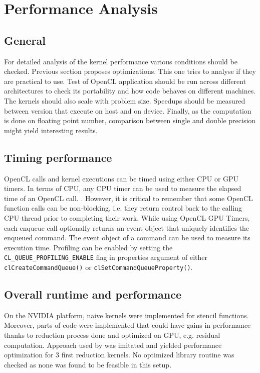 \chapter{Performance Analysis}
\section{General}
For detailed analysis of the kernel performance various conditions should be checked. Previous section proposes optimizations. This one tries to analyse if they are practical to use. Test of OpenCL application should be run across different architectures to check its portability and how code behaves on different machines. The kernels should also scale with problem size. Speedups should be measured between version that execute on host and on device. Finally, as the computation is done on floating point number, comparison between single and double precision might yield interesting results.

\section{Timing performance}
OpenCL calls and kernel executions can be timed using either CPU or GPU timers. In terms of CPU, any CPU timer can be used to measure the elapsed time of an OpenCL call. \cite{nvidia2011openclbest}. However, it is critical to remember that some OpenCL function calls can be non-blocking, i.e. they return control back to the calling CPU thread prior to completing their work. While using OpenCL GPU Timers, each enqueue call optionally returns an event object that uniquely identifies the enqueued command. The event object of a command can be used to measure its execution time. Profiling can be enabled by setting the \texttt{CL\_QUEUE\_PROFILING\_ENABLE} flag in properties argument of either \texttt{clCreateCommandQueue()} or \texttt{clSetCommandQueueProperty()}.\cite{nvidia2011openclbest}

\section{Overall runtime and performance}
On the NVIDIA platform, naive kernels were implemented for stencil functions. Moreover, parts of code were implemented that could have gains in performance thanks to reduction process done and optimized on GPU, e.g. residual computation. Approach used by \cite{christensen2012report} was imitated and yielded performance optimization for 3 first reduction kernels. No optimized library routine was checked as none was found to be feasible in this setup.

